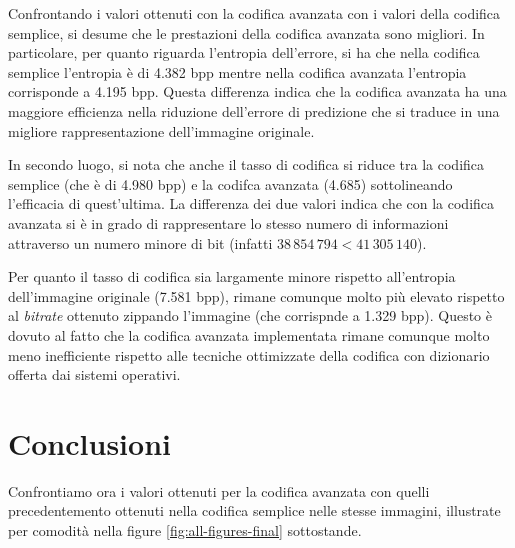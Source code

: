 Confrontando i valori ottenuti con la codifica avanzata con i valori della codifica semplice, si desume che le prestazioni della codifica avanzata sono migliori. In particolare, per quanto riguarda l'entropia dell'errore, si ha che nella codifica semplice l'entropia è di 4.382 bpp mentre nella codifica avanzata l'entropia corrisponde a 4.195 bpp. Questa differenza indica che la codifica avanzata ha una maggiore efficienza nella riduzione dell'errore di predizione che si traduce in una migliore rappresentazione dell'immagine originale.

In secondo luogo, si nota che anche il tasso di codifica si riduce tra la codifica semplice (che è di 4.980 bpp) e la codifca avanzata (4.685) sottolineando l'efficacia di quest'ultima. La differenza dei due valori indica che con la codifica avanzata si è in grado di rappresentare lo stesso numero di informazioni attraverso un numero minore di bit (infatti $38\,854\,794 < 41\,305\,140$).

Per quanto il tasso di codifica sia largamente minore rispetto all'entropia dell'immagine originale (7.581 bpp), rimane comunque molto più elevato rispetto al \textsl{bitrate} ottenuto zippando l'immagine (che corrispnde a 1.329 bpp). Questo è dovuto al fatto che la codifica avanzata implementata rimane comunque molto meno inefficiente rispetto alle tecniche ottimizzate della codifica con dizionario offerta dai sistemi operativi.




\vspace{25px}\section{Conclusioni}
Confrontiamo ora i valori ottenuti per la codifica avanzata con quelli precedentemento ottenuti nella codifica semplice nelle stesse immagini, illustrate per comodità nella figure \ref{fig:all-figures-final} sottostande.

